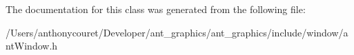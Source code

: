 The documentation for this class was generated from the following file\+:\begin{DoxyCompactItemize}
\item 
/\+Users/anthonycouret/\+Developer/ant\+\_\+graphics/ant\+\_\+graphics/include/window/ant\+Window.\+h\end{DoxyCompactItemize}
